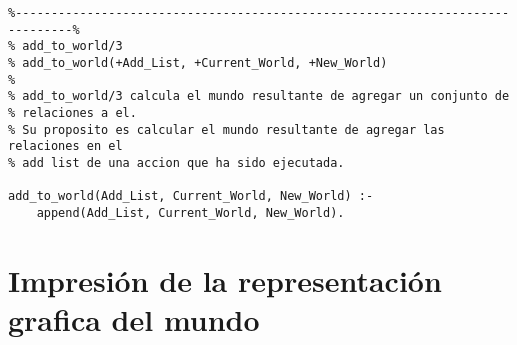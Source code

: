 \documentclass[a4paper,12pt]{report}
\begin{document}
\begin{footnotesize}
\begin{verbatim}
%------------------------------------------------------------------------------%
% add_to_world/3
% add_to_world(+Add_List, +Current_World, +New_World)
% 
% add_to_world/3 calcula el mundo resultante de agregar un conjunto de 
% relaciones a el.
% Su proposito es calcular el mundo resultante de agregar las relaciones en el 
% add list de una accion que ha sido ejecutada. 

add_to_world(Add_List, Current_World, New_World) :-
    append(Add_List, Current_World, New_World).

\end{verbatim}
\end{footnotesize}

\chapter{Impresi\'{o}n de la representaci\'{o}n grafica del mundo}
\end{document}
